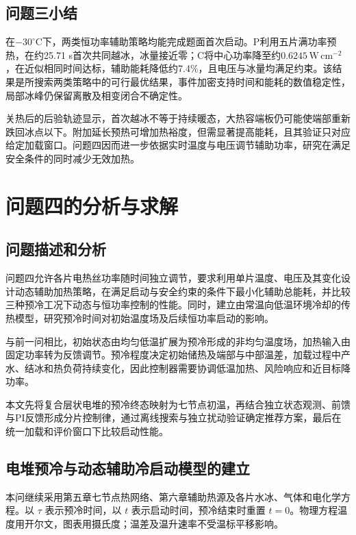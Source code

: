 \documentclass[bwprint]{gmcmthesis}
\numberwithin{equation}{section}
\numberwithin{figure}{section}
\begin{document}
\subsection{问题三小结}
在$-30^\circ\mathrm C$下，两类恒功率辅助策略均能完成题面首次启动。P利用五片满功率预热，在约25.71 s首次共同越冰，冰量接近零；C将中心功率降至约$0.6245\,\mathrm{W\,cm^{-2}}$，在近似相同时间达标，辅助能耗降低约7.4\%，且电压与冰量均满足约束。该结果是所搜索两类策略中的可行最优结果，事件加密支持时间和能耗的数值稳定性，局部冰峰仍保留离散及相变闭合不确定性。

关热后的后验轨迹显示，首次越冰不等于持续暖态，大热容端板仍可能使端部重新跌回冰点以下。附加延长预热可增加热裕度，但需显著提高能耗，且其验证只对应给定加载窗口。问题四因而进一步依据实时温度与电压调节辅助功率，研究在满足安全条件的同时减少无效加热。

\section{问题四的分析与求解}

\subsection{问题描述和分析}

问题四允许各片电热丝功率随时间独立调节，要求利用单片温度、电压及其变化设计动态辅助加热策略，在满足启动与安全约束的条件下最小化辅助总能耗，并比较三种预冷工况下动态与恒功率控制的性能。同时，建立由常温向低温环境冷却的传热模型，研究预冷时间对初始温度场及后续恒功率启动的影响。

与前一问相比，初始状态由均匀低温扩展为预冷形成的非均匀温度场，加热输入由固定功率转为反馈调节。预冷程度决定初始储热及端部与中部温差，加载过程中产水、结冰和热负荷持续变化，因此控制器需要协调低温加热、风险响应和近目标降功率。

本文先将复合层状电堆的预冷终态映射为七节点初温，再结合独立状态观测、前馈与PI反馈形成分片控制律，通过离线搜索与独立扰动验证确定推荐方案，最后在统一加载和评价窗口下比较启动性能。

\subsection{电堆预冷与动态辅助冷启动模型的建立}

本问继续采用第五章七节点热网络、第六章辅助热源及各片水冰、气体和电化学方程。以 $\tau$ 表示预冷时间，以 $t$ 表示启动时间，预冷结束时重置 $t=0$。物理方程温度用开尔文，图表用摄氏度；温差及温升速率不受温标平移影响。
\end{document}
